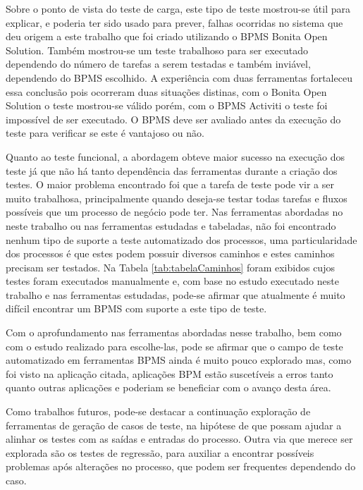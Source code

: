 \documentclass[12pt]{article}
\begin{document}
Sobre o ponto de vista do teste de carga, este tipo de teste mostrou-se útil para explicar, e poderia ter sido usado para prever, falhas ocorridas no sistema que deu origem a este trabalho que foi criado utilizando o BPMS Bonita Open Solution. Também mostrou-se um teste trabalhoso para ser executado dependendo do número de tarefas a serem testadas e também inviável, dependendo do BPMS escolhido. A experiência com duas ferramentas fortaleceu essa conclusão pois ocorreram duas situações distinas, com o Bonita Open Solution o teste mostrou-se válido porém, com o BPMS Activiti o teste foi impossível de ser executado. O BPMS deve ser avaliado antes da execução do teste para verificar se este é vantajoso ou não.

Quanto ao teste funcional, a abordagem obteve maior sucesso na execução dos teste já que não há tanto dependência das ferramentas durante a criação dos testes. O maior problema encontrado foi que a tarefa de teste pode vir a ser muito trabalhosa, principalmente quando deseja-se testar todas tarefas e fluxos possíveis que um processo de negócio pode ter.
Nas ferramentas abordadas no neste trabalho ou nas ferramentas estudadas e tabeladas, não foi encontrado nenhum tipo de suporte a teste automatizado dos processos, uma particularidade dos processos é que estes podem possuir diversos caminhos e estes caminhos precisam ser testados. Na Tabela \ref{tab:tabelaCaminhos} foram exibidos cujos testes foram executados manualmente e, com base no estudo executado neste trabalho e nas ferramentas estudadas, pode-se afirmar que atualmente é muito difícil encontrar um BPMS com suporte a este tipo de teste.

Com o aprofundamento nas ferramentas abordadas nesse trabalho, bem como com o estudo realizado para escolhe-las, pode se afirmar que o campo de teste automatizado em ferramentas BPMS ainda é muito pouco explorado mas, como foi visto na aplicação citada, aplicações BPM estão suscetíveis a erros tanto quanto outras aplicações e poderiam se beneficiar com o avanço desta área.

Como trabalhos futuros, pode-se destacar a continuação exploração de ferramentas de geração de casos de teste, na hipótese de que possam ajudar a alinhar os testes com as saídas e entradas do processo. Outra via que merece ser explorada são os testes de regressão, para auxiliar a encontrar possíveis problemas após alterações no processo, que podem ser frequentes dependendo do caso.




\end{document}
